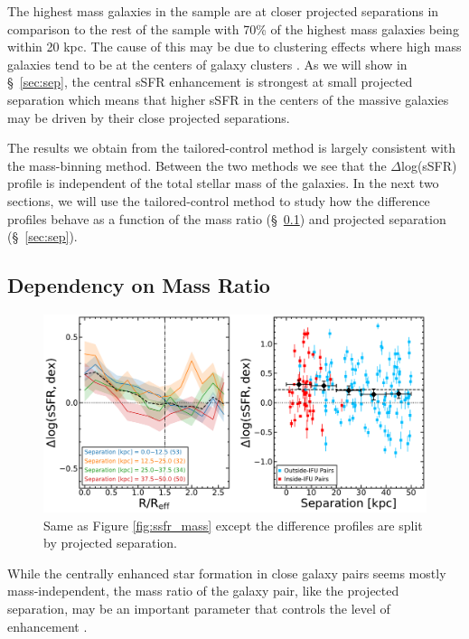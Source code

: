 \documentclass[apj,twocolumn]{emulateapj}
\begin{document}
\begin{CJK*}{UTF8}{gbsn}
The highest mass galaxies in the sample are at closer projected separations in comparison to the rest of the sample with 70\% of the highest mass galaxies being within 20 kpc.  The cause of this may be due to clustering effects where high mass galaxies tend to be at the centers of galaxy clusters \citep{Cooray:2002, Zehavi:2002}. As we will show in \S~\ref{sec:sep}, the central sSFR enhancement is strongest at small projected separation which means that higher sSFR in the centers of the massive galaxies may be driven by their close projected separations. 



The results we obtain from the tailored-control method is largely consistent with the mass-binning method. Between the two methods we see that the $\Delta$log(sSFR) profile is independent of the total stellar mass of the galaxies. In the next two sections, we will use the tailored-control method to study how the difference profiles behave as a function of the mass ratio (\S~\ref{sec:dm}) and projected separation (\S~\ref{sec:sep}).

\subsection{Dependency on Mass Ratio}\label{sec:dm}

\begin{figure}
\centering
\includegraphics[width=0.8\linewidth]{ssfr_sep.pdf}
\caption[]{Same as Figure \ref{fig:ssfr_mass} except the difference profiles are split by projected separation. }
\label{fig:ssfr_sep}
\end{figure}

While the centrally enhanced star formation in close galaxy pairs seems mostly mass-independent, the mass ratio of the galaxy pair, like the projected separation, may be an important parameter that controls the level of enhancement \citep{Ellison:2008}. 


\end{CJK*}
\end{document}
